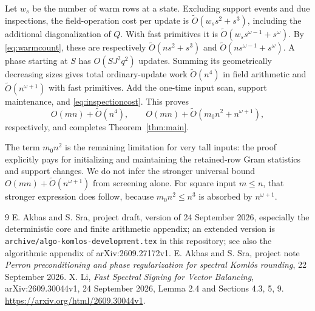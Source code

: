 \documentclass[11pt]{amsart}
\theoremstyle{remark}\newtheorem{remark}[theorem]{Remark}
\begin{document}
Let $w_s$ be the number of warm rows at a state. Excluding support events
and due inspections, the field-operation cost per update is
$\widetilde O(w_s s^2+s^3)$, including the additional diagonalization of
$Q$. With fast primitives it is
$\widetilde O(w_s s^{\omega-1}+s^\omega)$.
By \eqref{eq:warmcount}, these are respectively
$\widetilde O(ns^2+s^3)$ and
$\widetilde O(ns^{\omega-1}+s^\omega)$.
A phase starting at $S$ has $O(SJ^2q^2)$ updates. Summing its geometrically
decreasing sizes gives total ordinary-update work
$\widetilde O(n^4)$ in field arithmetic and
$\widetilde O(n^{\omega+1})$ with fast primitives.
Add the one-time input scan, support maintenance, and
\eqref{eq:inspectioncost}. This proves
\[
 O(mn)+\widetilde O(n^4),\qquad
 O(mn)+\widetilde O(m_0n^2+n^{\omega+1}),
\]
respectively, and completes Theorem~\ref{thm:main}.

The term $m_0n^2$ is the remaining limitation for very tall inputs: the
proof explicitly pays for initializing and maintaining the retained-row
Gram statistics and support changes. We do not infer the stronger
universal bound $O(mn)+\widetilde O(n^{\omega+1})$ from screening alone.
For square input $m\le n$, that stronger expression does follow, because
$m_0n^2\le n^3$ is absorbed by $n^{\omega+1}$.

\begin{thebibliography}{9}
 E. Akbas and S. Sra, project draft, version of
24 September 2026, especially the deterministic core and finite arithmetic
appendix; an extended version is
\nolinkurl{archive/algo-komlos-development.tex} in this repository; see
also the algorithmic appendix of arXiv:2609.27172v1.
 E. Akbas and S. Sra, project note
\emph{Perron preconditioning and phase regularization for spectral
Koml\'os rounding}, 22 September 2026.
 X. Li, \emph{Fast Spectral Signing for Vector Balancing},
arXiv:2609.30044v1, 24 September 2026, Lemma 2.4 and Sections 4.3, 5, 9.
\url{https://arxiv.org/html/2609.30044v1}.
\end{thebibliography}
\end{document}
